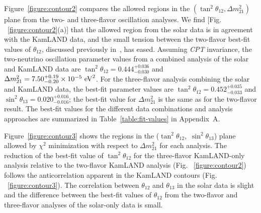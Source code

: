 \documentclass[aps,prc,twocolumn,groupedaddress,showpacs,amsmath,amssymb,floatfix,superscriptaddress]{revtex4}
\begin{document}
Figure~\ref{figure:contour2} compares the allowed regions in the \mbox{$(\tan^{2}\theta_{12}, \Delta m^{2}_{21})$} plane from the two- and three-flavor oscillation analyses.  
We find [Fig. ~\ref{figure:contour2}(a)] that the allowed region from the solar data is in agreement with the KamLAND data, and the small tension between the two-flavor best-fit values of $\theta_{12}$, discussed previously in~\cite{Fogli2008, Garcia2010}, has eased.  Assuming {\it CPT} invariance, the two-neutrino oscillation parameter values from a combined analysis of the solar and KamLAND data are $\tan^{2} \theta_{12} = 0.444^{+0.036}_{-0.030}$ and $\Delta m^{2}_{21} = 7.50^{+0.19}_{-0.20} \times 10^{-5} ~ {\rm eV}^{2}$.  For the three-flavor analysis combining the solar and KamLAND data, the best-fit parameter values are $\tan^{2} \theta_{12} = 0.452^{+0.035}_{-0.033}$ and $\sin^{2} \theta_{13} = 0.020^{+0.016}_{-0.016}$; the best-fit value for $\Delta m^2_{21}$ is the same as for the two-flavor result. The best-fit values for the different data combinations and analysis approaches are summarized in Table~\ref{table:fit-values} in Appendix~A.

Figure~\ref{figure:contour3} shows the regions in the \mbox{($\tan^{2} \theta_{12}$, $\sin^{2} \theta_{13}$)} plane allowed by $\chi^{2}$ minimization with respect to $\Delta m^{2}_{21}$ for each analysis.  The reduction of the best-fit value of $\tan^{2}\theta_{12}$ for the three-flavor KamLAND-only analysis relative to the two-flavor KamLAND analysis (Fig. ~\ref{figure:contour2}) follows the anticorrelation apparent in the KamLAND contours (Fig. ~\ref{figure:contour3}). The correlation between $\theta_{12}$ and $\theta_{13}$ in the solar data is slight and the difference between the best-fit values of $\theta_{12}$ from the two-flavor and three-flavor analyses of the solar-only data is small.  
\end{document}
